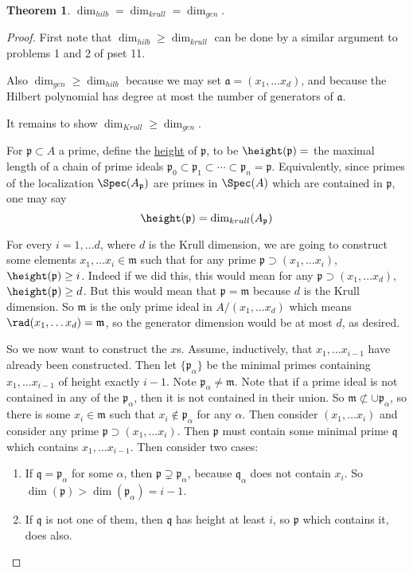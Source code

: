\documentclass[12 pt]{article}
\theoremstyle{definition}
\newtheorem{theorem}{Theorem}[section]
\newcommand\fa{{\mathfrak a}}
\newcommand\fp{{\mathfrak p}}
\newcommand\fq{{\mathfrak q}}
\begin{document}
\begin{theorem} $\dim_{hilb}=\dim_{krull}=\dim_{gen}$.
\end{theorem}
\begin{proof}
First note that $\dim_{hilb} \geq \dim_{krull}$ can be done by a similar argument to problems 1 and 2 of pset 11.

Also $\dim_{gen} \geq \dim_{hilb}$ because we may set $\fa=(x_1, \ldots x_d)$, and because the Hilbert polynomial has degree at most the number of generators of $\fa$.

It remains to show $\dim_{Krull} \geq \dim_{gen}$.

\begin{definition} For $\fp \subset A$ a prime, define the \underline{height} of $\fp$, to be $\height(\fp)=$ the maximal length of a chain of prime ideals $\fp_0 \subset \fp_1 \subset \cdots \subset \fp_n=\fp$. Equivalently, since primes of the localization $\Spec(A_{\fp})$ are primes in $\Spec(A)$ which are contained in $\fp$, one may say
\[\height(\fp)=\dim_{krull}(A_\fp)\]
\end{definition}

For every $i=1, \ldots d$, where $d$ is the Krull dimension, we are going to construct some elements $x_1, \ldots x_i \in \mathfrak{m}$ such that for any prime $\fp \supset (x_1, \ldots x_i)$, $\height(\fp) \geq i$. Indeed if we did this, this would mean for any $\fp \supset (x_1, \ldots x_d)$, $\height(\fp) \geq d$. But this would mean that $\fp=\mathfrak{m}$ because $d$ is the Krull dimension. So $\mathfrak{m}$ is the only prime ideal in $A/(x_1, \ldots x_d)$ which means $\rad(x_1, \ldots x_d)=\mathfrak{m}$, so the generator dimension would be at most $d$, as desired.

So we now want to construct the $x$s. Assume, inductively, that $x_1, \ldots x_{i-1}$ have already been constructed. Then let $\{\fp_\alpha\}$ be the minimal primes containing $x_1, \ldots x_{i-1}$ of height exactly $i-1$. Note $\fp_\alpha \neq \mathfrak{m}$. Note that if a prime ideal is not contained in any of the $\fp_\alpha$, then it is not contained in their union. So $\mathfrak{m} \not \subset \cup \fp_\alpha$, so there is some $x_i \in \mathfrak{m}$ such that $x_i \not \in \fp_\alpha$ for any $\alpha$. Then consider $(x_1, \ldots x_i)$ and consider any prime $\fp \supset (x_1, \ldots x_i)$. Then $\fp$ must contain some minimal prime $\fq$ which contains $x_1, \ldots x_{i-1}$. Then consider two cases:
\begin{enumerate}
\item If $\fq=\fp_\alpha$ for some $\alpha$, then $\fp \supsetneq \fp_\alpha$, because $\fq_\alpha$ does not contain $x_i$. So $\dim(\fp)>\dim(\fp_\alpha)=i-1$.

\item If $\fq$ is not one of them, then $\fq$ has height at least $i$, so $\fp$ which contains it, does also.
\end{enumerate}

\end{proof}
\end{document}
